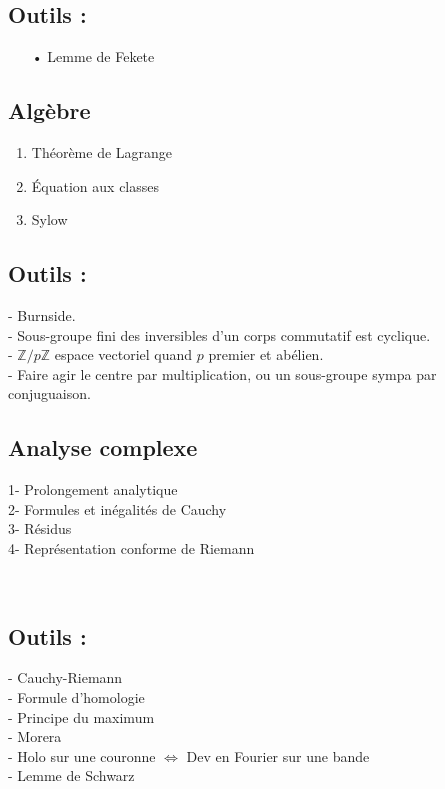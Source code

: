 \documentclass[11pt,a4paper]{article}
\begin{document}
\subsection*{Outils :}
\begin{itemize}
\item[•] Lemme de Fekete
\end{itemize}



\newpage
\begin{center}
\section*{Algèbre} 
\end{center}

\begin{enumerate}
\item Théorème de Lagrange
\item Équation aux classes
\item Sylow
\end{enumerate}
\subsection*{Outils :}
- Burnside. \\
- Sous-groupe fini des inversibles d'un corps commutatif est cyclique. \\
- $\mathbb{Z}/p\mathbb{Z}$ espace vectoriel quand $p$ premier et abélien. \\
- Faire agir le centre par multiplication, ou un sous-groupe sympa par conjuguaison.




\newpage
\begin{center}
\section*{Analyse complexe} 
\end{center}

1- Prolongement analytique \\

2- Formules et inégalités de Cauchy \\

3- Résidus \\

4- Représentation conforme de Riemann

~\\

\subsection*{Outils :}
- Cauchy-Riemann \\

- Formule d'homologie \\

- Principe du maximum \\

- Morera \\

- Holo sur une couronne $\Leftrightarrow$ Dev en Fourier sur une bande \\

- Lemme de Schwarz \\
\end{document}

